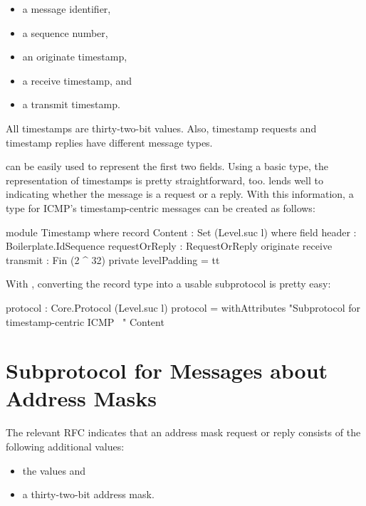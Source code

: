 \documentclass{report}
\begin{document}
\begin{itemize}
  \item a message identifier,
  \item a sequence number,
  \item an originate timestamp,
  \item a receive timestamp, and
  \item a transmit timestamp.
\end{itemize}

All timestamps are thirty-two-bit values.  Also, timestamp requests and timestamp replies have different message types.

 can be easily used to represent the first two fields.  Using a basic  type, the representation of timestamps is pretty straightforward, too.   lends well to indicating whether the message is a request or a reply.  With this information, a type  for ICMP's timestamp-centric messages can be created as follows:

\begin{code}
    module Timestamp where
      record Content : Set (Level.suc l) where
        field
          header : Boilerplate.IdSequence
          requestOrReply : RequestOrReply
          originate
           receive
           transmit : Fin (2 ^ 32)
        private
          levelPadding = tt
\end{code}

With , converting the record type into a usable subprotocol is pretty easy:

\begin{code}
      protocol : Core.Protocol (Level.suc l)
      protocol = withAttributes "Subprotocol for timestamp-centric ICMP \
                                \messages"
                                Content
\end{code}

\section{Subprotocol for Messages about Address Masks}
The relevant RFC indicates that an address mask request or reply consists of the following additional values:

\begin{itemize}
  \item the  values and
  \item a thirty-two-bit address mask.
\end{itemize}
\end{document}
